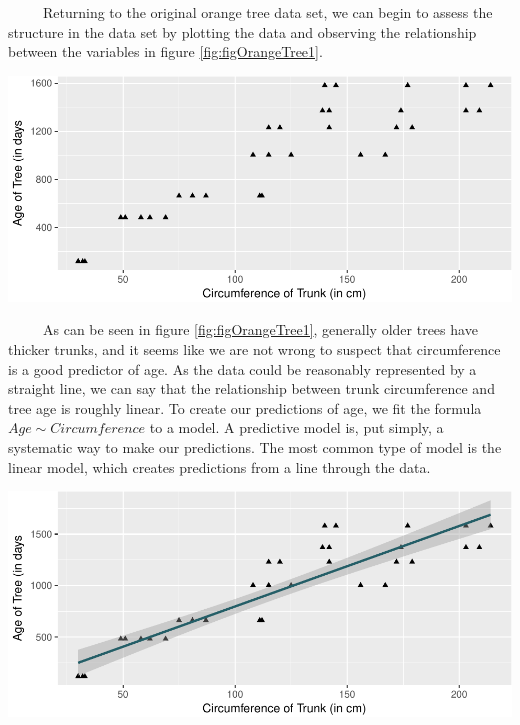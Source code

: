 \documentclass[12pt,twoside]{reedthesis}
\let\origfigure\figure
\let\endorigfigure\endfigure
\renewenvironment{figure}[1][2] {
    \expandafter\origfigure\expandafter[H]
} {
    \endorigfigure
}
\begin{document}
  ~~~~~Returning to the original orange tree data set, we can begin to
  assess the structure in the data set by plotting the data and observing
  the relationship between the variables in figure
  \ref{fig:figOrangeTree1}.
  
  \begin{figure}[H]
  
  {\centering \includegraphics{Thesis_files/figure-latex/figOrangeTree1-1} 
  
  }
  
  \caption{The relationship between age and circumference of the trunk of orange trees.}\label{fig:figOrangeTree1}
  \end{figure}
  
  ~~~~~As can be seen in figure \ref{fig:figOrangeTree1}, generally older
  trees have thicker trunks, and it seems like we are not wrong to suspect
  that circumference is a good predictor of age. As the data could be
  reasonably represented by a straight line, we can say that the
  relationship between trunk circumference and tree age is roughly linear.
  To create our predictions of age, we fit the formula
  \(Age \sim Circumference\) to a model. A predictive model is, put
  simply, a systematic way to make our predictions. The most common type
  of model is the linear model, which creates predictions from a line
  through the data.
  
  \begin{figure}[htbp]
  \centering
  \includegraphics{Thesis_files/figure-latex/unnamed-chunk-3-1.pdf}
  \caption{\label{fig:unnamed-chunk-3}\label{fig:OrangeLM}A linear model
  representing age \textasciitilde{} trunk circumference in orange trees.
  The shaded area represents a 95\% confidence interval around this line.}
  \end{figure}
  
\end{document}
